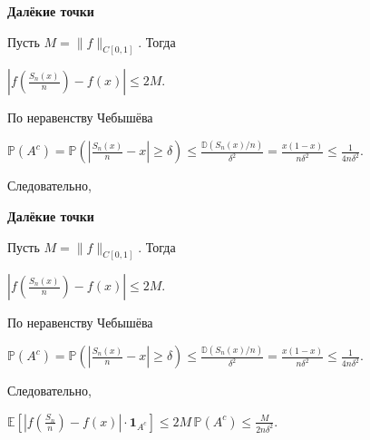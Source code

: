 \documentclass[11pt]{article}
\begin{document}
\newpage

\begin{center}
{\color{notaeYELLOW}\bfseries\fontsize{44}{52}\selectfont Далёкие точки}
\end{center}
\vspace*{\fill}
\begin{center}
\fontsize{36}{43}\selectfont
Пусть $M = \|f\|_{C[0,1]}$. Тогда\par\vspace{0.4in}
$\left| f\!\left(\frac{S_n(x)}{n}\right) - f(x) \right| \leqslant 2M.$\par\vspace{0.4in}
По неравенству Чебышёва \par\vspace{0.4in}
$\mathbb{P}(A^c) = \mathbb{P}\left( \left|\frac{S_n(x)}{n} - x\right| \geqslant \delta \right) \leqslant \frac{\mathbb{D}(S_n(x)/n)}{\delta^2} = \frac{x(1-x)}{n\delta^2} \leqslant \frac{1}{4n\delta^2}.$\par\vspace{0.4in}
Следовательно,\par\vspace{0.4in}
\end{center}
\vspace*{\fill}

\newpage

\begin{center}
{\color{notaeYELLOW}\bfseries\fontsize{44}{52}\selectfont Далёкие точки}
\end{center}
\vspace*{\fill}
\begin{center}
\fontsize{36}{43}\selectfont
Пусть $M = \|f\|_{C[0,1]}$. Тогда\par\vspace{0.4in}
$\left| f\!\left(\frac{S_n(x)}{n}\right) - f(x) \right| \leqslant 2M.$\par\vspace{0.4in}
По неравенству Чебышёва \par\vspace{0.4in}
$\mathbb{P}(A^c) = \mathbb{P}\left( \left|\frac{S_n(x)}{n} - x\right| \geqslant \delta \right) \leqslant \frac{\mathbb{D}(S_n(x)/n)}{\delta^2} = \frac{x(1-x)}{n\delta^2} \leqslant \frac{1}{4n\delta^2}.$\par\vspace{0.4in}
Следовательно,\par\vspace{0.4in}
$\mathbb{E}\left[ \left| f\!\left(\frac{S_n}{n}\right) - f(x) \right| \cdot \mathbf{1}_{A^c} \right] \leqslant 2M \, \mathbb{P}(A^c) \leqslant \frac{M}{2n\delta^2}.$\par\vspace{0.4in}
\end{center}
\vspace*{\fill}
\end{document}
